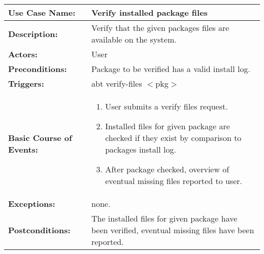 
\begin{tabularx}{\linewidth}{|l|X|}
\hline
\textbf{Use Case Name:} & \textbf{Verify installed package files} \\
\hline
\textbf{Description:} & 
Verify that the given packages files are available on the system. 
\\
\hline
\textbf{Actors:} & User \\
\hline
\textbf{Preconditions:} & Package to be verified has a valid install log. \\
\hline
\textbf{Triggers:} & abt verify-files $<$pkg$>$ \\
\hline
\textbf{Basic Course of Events:} & 
\begin{minipage}{\linewidth} 
  \vspace{0.05em}
  \begin{enumerate}
    \item User submits a verify files request.
    \item Installed files for given package are checked if they exist by comparison to packages install log.
    \item After package checked, overview of eventual missing files reported to user.
  \end{enumerate}
  \vspace{0.05em}
\end{minipage}
\\
\hline 
\textbf{Exceptions:} & none. \\
\hline 
\textbf{Postconditions:} &
The installed files for given package have been verified, eventual missing files have been reported. \\
\hline
\end{tabularx}


